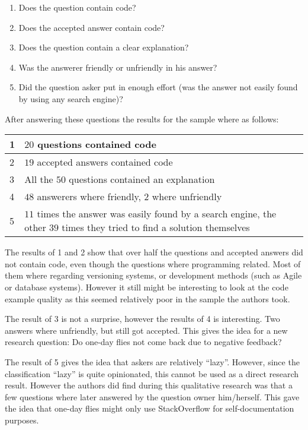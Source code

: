 \documentclass[conference]{IEEEtran}
\begin{document}
\begin{enumerate}
\item Does the question contain code?
\item Does the accepted answer contain code?
\item Does the question contain a clear explanation?
\item Was the answerer friendly or unfriendly in his answer?
\item Did the question asker put in enough effort (was the answer not easily found by using any search engine)?
\end{enumerate}

After answering these questions the results for the sample where as follows:
\newline
\newline
\begin{tabular}{ | l | p{8cm} | }
\hline
  1 & $20$ questions contained code \\
\hline
  2 & $19$ accepted answers contained code \\
\hline
  3 & All the $50$ questions contained an explanation \\
\hline
  4 & $48$ answerers where friendly, $2$ where unfriendly \\
\hline
  5 & $11$ times the answer was easily found by a search engine, the other $39$ times they tried to find a solution themselves \\
\hline
\end{tabular}
\newline
\newline

The results of 1 and 2 show that over half the questions and accepted answers did not contain code, even though the questions where programming related. Most of them where regarding versioning systems, or development methods (such as Agile or database systems).  However it still might be interesting to look at the code example quality as this seemed relatively poor in the sample the authors took.

The result of 3 is not a surprise, however the results of 4 is interesting. Two answers where unfriendly, but still got accepted. This gives the idea for a new research question: Do one-day flies  not come back due to negative feedback? 

The result of 5  gives the idea that askers are relatively ``lazy''. However, since the classification ``lazy'' is quite opinionated, this cannot be used as a direct research result. However the authors did find during this qualitative research was that a few questions where later answered by the question owner him/herself. This gave the idea that one-day flies might only use StackOverflow for self-documentation purposes. 
\end{document}
